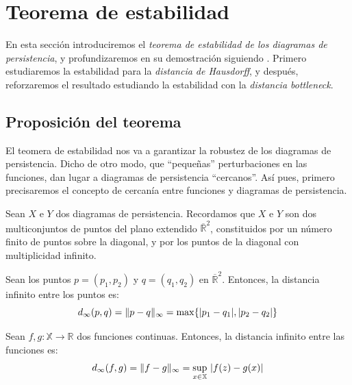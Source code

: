 
\section{Teorema de estabilidad}
En esta sección introduciremos el \emph{teorema de estabilidad de los diagramas de persistencia}, y profundizaremos en su demostración siguiendo \cite{Cohen-Steiner2007}. Primero estudiaremos la estabilidad para la \emph{distancia de Hausdorff}, y después, reforzaremos el resultado estudiando la estabilidad con la \emph{distancia bottleneck}.
\subsection{Proposición del teorema}
El teomera de estabilidad nos va a garantizar la robustez de los diagramas de persistencia. Dicho de otro modo, que ``pequeñas'' perturbaciones en las funciones, dan lugar a diagramas de persistencia ``cercanos''. Así pues, primero precisaremos el concepto de cercanía entre funciones y diagramas de persistencia.

Sean $X$ e $Y$ dos diagramas de persistencia. Recordamos que $X$ e $Y$ son dos multiconjuntos de puntos del plano extendido $\overline{\mathbb{R}}^2$, constituidos por un número finito de puntos sobre la diagonal, y por los puntos de la diagonal con multiplicidad infinito. 

\begin{definition}
Sean los puntos $p=(p_1, p_2)$ y $q=(q_1,q_2)$ en $\overline{\mathbb{R}}^2$. Entonces, la distancia infinito entre los puntos es:
\[
d_\infty(p, q)=\lVert p-q\rVert_\infty= \max\{\lvert p_1 - q_1\rvert, \lvert p_2-q_2\rvert\}
\]
\end{definition}

\begin{definition}
Sean $f,g: \mathbb{X} \to \mathbb{R}$ dos funciones continuas. Entonces, la distancia infinito entre las funciones es:
\[
d_\infty(f, g)=\lVert f-g\rVert_\infty= \sup_{x\in \mathbb{X}}\ \lvert f(z) - g(x)\rvert 
\]
\end{definition}

